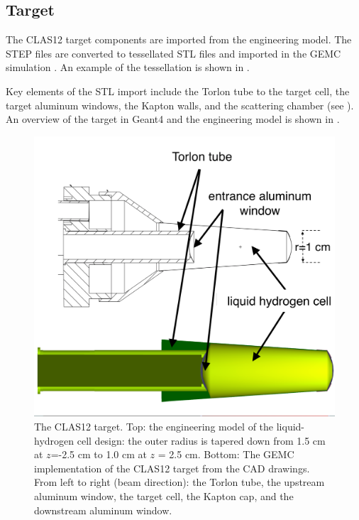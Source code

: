 \subsection{Target}

The CLAS12 target components are imported from the engineering model. The STEP files are converted to tessellated STL files and imported
in the GEMC simulation \cite{targetCorrection, targetStudy}. An example of the tessellation is shown in .

Key elements of the STL import include the Torlon tube to the target cell,
the target aluminum windows, the Kapton walls, and the scattering chamber (see ).
An overview of the target in Geant4 and the engineering model is shown in .

\begin{figure}
	\centering
	\includegraphics[width=0.99\columnwidth,keepaspectratio]{img/targetDesign.png}
	\caption{The CLAS12 target. Top: the engineering model of the liquid-hydrogen cell design: the outer radius is
             tapered down from 1.5 cm at $z$=-2.5 cm to 1.0 cm at $z$ = 2.5 cm.
             Bottom: The GEMC implementation of the CLAS12 target from the CAD drawings. From left to right (beam direction):
             the Torlon tube, the upstream aluminum window, the target cell, the Kapton cap, and the
			 downstream aluminum window. }
	\label{fig:targetDesign}
\end{figure}



